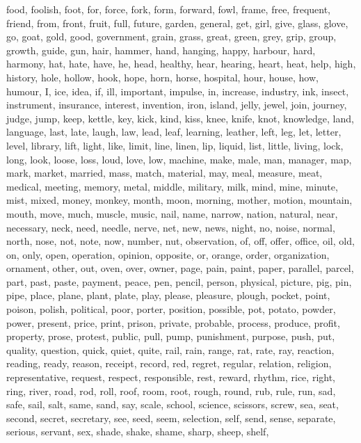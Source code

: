 food, foolish, foot, for, force, fork, form, forward, fowl, frame, free,
frequent, friend, from, front, fruit, full, future, garden, general, get,
girl, give, glass, glove, go, goat, gold, good, government, grain, grass,
great, green, grey, grip, group, growth, guide, gun, hair, hammer, hand,
hanging, happy, harbour, hard, harmony, hat, hate, have, he, head, healthy,
hear, hearing, heart, heat, help, high, history, hole, hollow, hook, hope,
horn, horse, hospital, hour, house, how, humour, I, ice, idea, if, ill,
important, impulse, in, increase, industry, ink, insect, instrument,
insurance, interest, invention, iron, island, jelly, jewel, join, journey,
judge, jump, keep, kettle, key, kick, kind, kiss, knee, knife, knot,
knowledge, land, language, last, late, laugh, law, lead, leaf, learning,
leather, left, leg, let, letter, level, library, lift, light, like, limit,
line, linen, lip, liquid, list, little, living, lock, long, look, loose, loss,
loud, love, low, machine, make, male, man, manager, map, mark, market,
married, mass, match, material, may, meal, measure, meat, medical, meeting,
memory, metal, middle, military, milk, mind, mine, minute, mist, mixed, money,
monkey, month, moon, morning, mother, motion, mountain, mouth, move, much,
muscle, music, nail, name, narrow, nation, natural, near, necessary, neck,
need, needle, nerve, net, new, news, night, no, noise, normal, north, nose,
not, note, now, number, nut, observation, of, off, offer, office, oil, old,
on, only, open, operation, opinion, opposite, or, orange, order, organization,
ornament, other, out, oven, over, owner, page, pain, paint, paper, parallel,
parcel, part, past, paste, payment, peace, pen, pencil, person, physical,
picture, pig, pin, pipe, place, plane, plant, plate, play, please, pleasure,
plough, pocket, point, poison, polish, political, poor, porter, position,
possible, pot, potato, powder, power, present, price, print, prison, private,
probable, process, produce, profit, property, prose, protest, public, pull,
pump, punishment, purpose, push, put, quality, question, quick, quiet, quite,
rail, rain, range, rat, rate, ray, reaction, reading, ready, reason, receipt,
record, red, regret, regular, relation, religion, representative, request,
respect, responsible, rest, reward, rhythm, rice, right, ring, river, road,
rod, roll, roof, room, root, rough, round, rub, rule, run, sad, safe, sail,
salt, same, sand, say, scale, school, science, scissors, screw, sea, seat,
second, secret, secretary, see, seed, seem, selection, self, send, sense,
separate, serious, servant, sex, shade, shake, shame, sharp, sheep, shelf,
